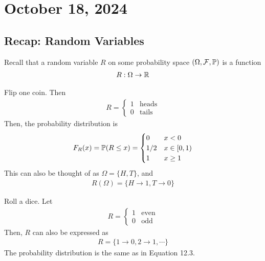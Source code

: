 \section{October 18, 2024}

\subsection{Recap: Random Variables}
Recall that a random variable $R$ on some probability space $(\Omega, \mathcal{F}, \mathbb{P})$ is a function
\begin{align}
    R: \Omega \to \mathbb{R}
\end{align}
\begin{example}
    Flip one coin. Then
    \begin{align}
        R = \begin{cases}
            1 & \text{heads}\\
            0 & \text{tails}
        \end{cases}
    \end{align}
    Then, the probability distribution is
    \begin{align}
        F_R(x) = \mathbb{P}(R \le x) = \begin{cases}
            0 & x < 0\\
            1/2 & x \in [0,1)\\
            1 & x \ge 1
        \end{cases}
    \end{align}
    This can also be thought of as $\Omega = \{ H, T \}$, and
    \begin{align}
        R(\Omega) = \{ H \to 1, T \to 0 \}
    \end{align}
\end{example}

\begin{example}
    Roll a dice. Let
    \begin{align}
        R = \begin{cases}
            1 & \text{even}\\
            0 & \text{odd}
        \end{cases}
    \end{align}
    Then, $R$ can also be expressed as
    \begin{align}
        R = \{ 1 \to 0, 2 \to 1, \cdots \}
    \end{align}
    The probability distribution is the same as in Equation 12.3.
\end{example}

